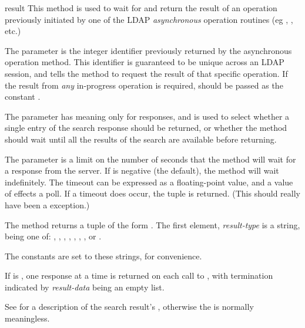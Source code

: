 
\begin{methoddesc}[tuple]{result}{}
This method is used to wait for and return the result of an operation
previously initiated by one of the LDAP \emph{asynchronous} operation routines
(eg , , etc.) 

The  parameter is the integer identifier previously returned by the
asynchronous operation method. 
This identifier is guaranteed to be unique across an LDAP session,
and tells the  method to request the result of that
specific operation.
If the result from \emph{any} in-progress operation is required, 
 should be passed as the constant .

The 
parameter has meaning only for  responses, and is used to select 
whether a single entry of the search response should be returned, or whether
the  method should wait until all the results of the search 
are available before returning. 

The  parameter is a limit on the number of seconds that the
method will wait for a response from the server. 
If  is negative (the default), the method will wait indefinitely.
The timeout can be expressed as a floating-point value, and
a value of  effects a poll.
If a timeout does occur, the tuple  is returned.
(This should really have been a  exception.)

The  method returns a tuple of the form 
.
The first element, \textit{result-type} is a string, being one of:
, ,
, 
, , , 
, or .

The constants  are set to these strings, for convenience.

If  is , one response at a time is returned on
each call to , with termination indicated by 
\textit{result-data} being an empty list.

See  for a description of the search result's ,
otherwise the  is normally meaningless.

\end{methoddesc}


